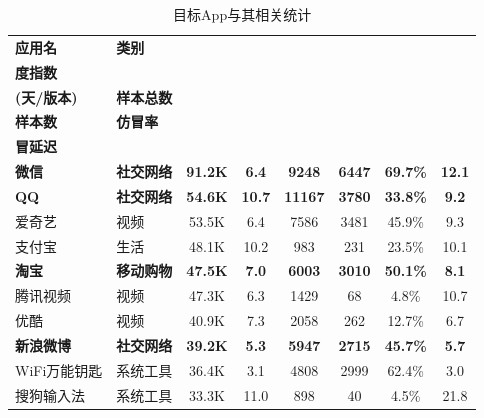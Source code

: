 \begin{ThreePartTable}
\centering
\renewcommand{\arraystretch}{1.05}
\footnotesize
\setlength{\belowcaptionskip}{-5pt}
\vspace{1mm}
\begin{longtable}{l l c c c c c c}
\caption{目标App与其相关统计}\label{table:data-statistics}\\
\toprule
{\bf 应用名} & {\bf 类别} & \begin{tabular}[c]{@{}c@{}}{\bf 月度热} \\ {\bf 度指数} \end{tabular} & \begin{tabular}[c]{@{}c@{}}{\bf 更新频率} \\ {\bf (天/版本)} \end{tabular} & {\bf 样本总数} & \begin{tabular}[c]{@{}c@{}}{\bf 仿冒} \\ {\bf 样本数} \end{tabular} & {\bf 仿冒率} & \begin{tabular}[c]{@{}c@{}}{\bf 平均仿} \\ {\bf 冒延迟} \end{tabular} \\
\midrule
{\bf 微信}\tnote{*} & {\bf 社交网络} & {\bf 91.2K} & {\bf 6.4} & {\bf 9248} & {\bf 6447} & {\bf 69.7\%} & {\bf 12.1} \\
\rowcolor{gray!15} {\bf QQ}\tnote{*} & {\bf 社交网络} & {\bf 54.6K} & {\bf 10.7} & {\bf 11167} & {\bf 3780} & {\bf 33.8\%} & {\bf 9.2} \\
爱奇艺 & 视频 & 53.5K & 6.4 & 7586 & 3481 & 45.9\% & 9.3 \\
\rowcolor{gray!15} 支付宝 & 生活 & 48.1K & 10.2 & 983 & 231 & 23.5\% & 10.1 \\
{\bf 淘宝}\tnote{*} & {\bf 移动购物} & {\bf 47.5K} & {\bf 7.0} & {\bf 6003} & {\bf 3010} & {\bf 50.1\%} & {\bf 8.1} \\
\rowcolor{gray!15} 腾讯视频 & 视频 & 47.3K & 6.3 & 1429 & 68 & 4.8\% & 10.7 \\
优酷 & 视频 & 40.9K & 7.3 & 2058 & 262 & 12.7\% & 6.7 \\
{\bf 新浪微博}\tnote{*} & {\bf 社交网络} & {\bf 39.2K} & {\bf 5.3} & {\bf 5947} & {\bf 2715} & {\bf 45.7\%} & {\bf 5.7} \\
\rowcolor{gray!15} WiFi万能钥匙 & 系统工具 & 36.4K & 3.1 & 4808 & 2999 & 62.4\% & 3.0 \\
搜狗输入法 & 系统工具 & 33.3K & 11.0 & 898 & 40 & 4.5\% & 21.8 \\

\end{longtable}
\end{ThreePartTable}
